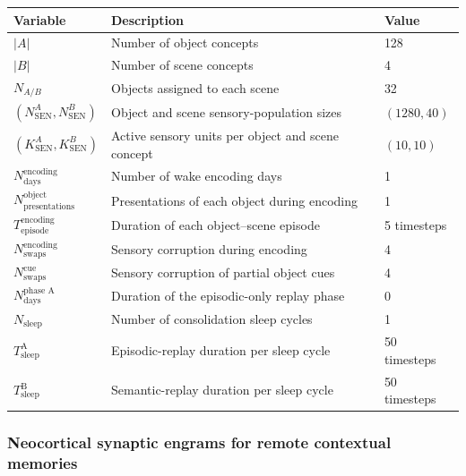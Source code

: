 \documentclass{article}
\providecommand{\DIFaddbeginFL}{} %
\providecommand{\DIFaddendFL}{} %
\providecommand{\DIFdelendFL}{} %
\begin{document}
\begin{table}[h!]
\DIFdelendFL \DIFaddbeginFL \begin{tabular}{lll}
\toprule
\textbf{Variable} & \textbf{Description} & \textbf{Value} \\
\midrule
$|A|$ & Number of object concepts & 128 \\
$|B|$ & Number of scene concepts & 4 \\
$N_{A/B}$ & Objects assigned to each scene & 32 \\
$(N_{\textrm{SEN}}^A, N_{\textrm{SEN}}^B)$ & Object and scene sensory-population sizes & $(1280, 40)$ \\
$(K_{\textrm{SEN}}^A, K_{\textrm{SEN}}^B)$ & Active sensory units per object and scene concept & $(10, 10)$ \\
\midrule
$N_{\textrm{days}}^{\textrm{encoding}}$ & Number of wake encoding days & 1 \\
$N_{\textrm{presentations}}^{\textrm{object}}$ & Presentations of each object during encoding & 1 \\
$T_{\textrm{episode}}^{\textrm{encoding}}$ & Duration of each object--scene episode & 5 timesteps \\
$N_{\textrm{swaps}}^{\textrm{encoding}}$ & Sensory corruption during encoding & 4 \\
$N_{\textrm{swaps}}^{\textrm{cue}}$ & Sensory corruption of partial object cues & 4 \\
\midrule
$N_{\textrm{days}}^{\textrm{phase A}}$ & Duration of the episodic-only replay phase & 0 \\
$N_{\textrm{sleep}}$ & Number of consolidation sleep cycles & 1 \\
$T_{\textrm{sleep}}^{\textrm{A}}$ & Episodic-replay duration per sleep cycle & 50 timesteps \\
$T_{\textrm{sleep}}^{\textrm{B}}$ & Semantic-replay duration per sleep cycle & 50 timesteps \\
\bottomrule
\end{tabular}
\DIFaddendFL \end{table}

\subsubsection*{Neocortical synaptic engrams for remote contextual memories }
\end{document}
